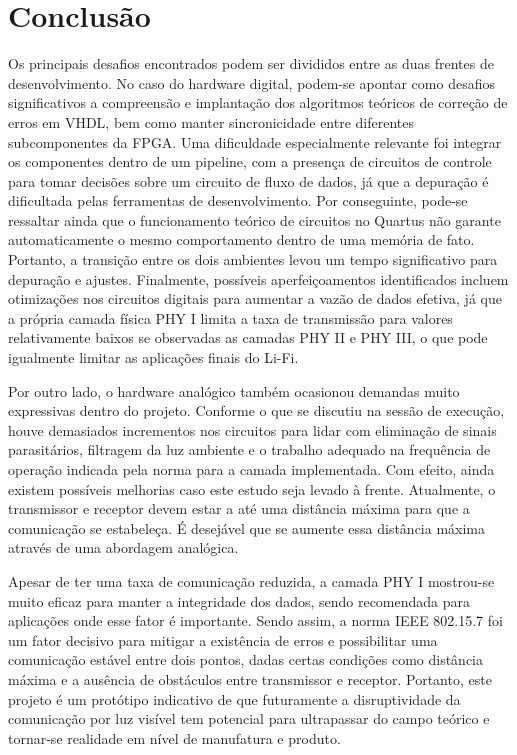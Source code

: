 	\chapter{Conclusão}\label{cap-conclusao}
		
	Os principais desafios encontrados podem ser divididos entre as duas frentes de desenvolvimento. No caso do hardware digital, podem-se apontar como desafios significativos a compreensão e implantação dos algoritmos teóricos de correção de erros em VHDL, bem como manter sincronicidade entre diferentes subcomponentes da FPGA. Uma dificuldade especialmente relevante foi integrar os componentes dentro de um pipeline, com a presença de circuitos de controle para tomar decisões sobre um circuito de fluxo de dados, já que a depuração é dificultada pelas ferramentas de desenvolvimento. Por conseguinte, pode-se ressaltar ainda que o funcionamento teórico de circuitos no Quartus não garante automaticamente o mesmo comportamento dentro de uma memória de fato. Portanto, a transição entre os dois ambientes levou um tempo significativo para depuração e ajustes. Finalmente, possíveis aperfeiçoamentos identificados incluem otimizações nos circuitos digitais para aumentar a vazão de dados efetiva, já que a própria camada física PHY I limita a taxa de transmissão para valores relativamente baixos se observadas as camadas PHY II e PHY III, o que pode igualmente limitar as aplicações finais do Li-Fi.
	
	Por outro lado, o hardware analógico também ocasionou demandas muito expressivas dentro do projeto. Conforme o que se discutiu na sessão de execução, houve demasiados incrementos nos circuitos para lidar com eliminação de sinais parasitários, filtragem da luz ambiente e o trabalho adequado na frequência de operação indicada pela norma para a camada implementada. Com efeito, ainda existem possíveis melhorias caso este estudo seja levado à frente. Atualmente, o transmissor e receptor devem estar a até uma distância máxima para que a comunicação se estabeleça. É desejável que se aumente essa distância máxima através de uma abordagem analógica.
	
	Apesar de ter uma taxa de comunicação reduzida, a camada PHY I mostrou-se muito eficaz para manter a integridade dos dados, sendo recomendada para aplicações onde esse fator é importante. Sendo assim, a norma IEEE 802.15.7 foi um fator decisivo para mitigar a existência de erros e possibilitar uma comunicação estável entre dois pontos, dadas certas condições como distância máxima e a ausência de obstáculos entre transmissor e receptor. Portanto, este projeto é um protótipo indicativo de que futuramente a disruptividade da comunicação por luz visível tem potencial para ultrapassar do campo teórico e tornar-se realidade em nível de manufatura e produto. 
	
